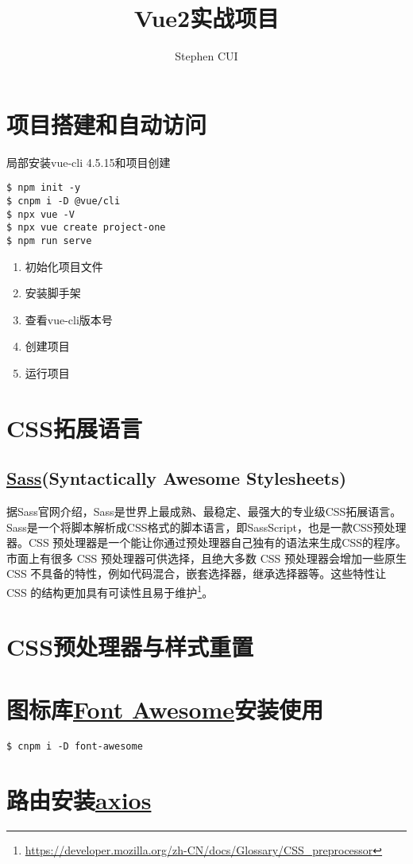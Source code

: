 \documentclass{article}
\title{Vue2实战项目}
\author{Stephen CUI}
\begin{document}
\maketitle
\section{项目搭建和自动访问}
局部安装vue-cli 4.5.15和项目创建
\begin{lstlisting}
$ npm init -y
$ cnpm i -D @vue/cli
$ npx vue -V
$ npx vue create project-one
$ npm run serve
\end{lstlisting}

\begin{enumerate}
\item 初始化项目文件
\item 安装脚手架
\item 查看vue-cli版本号
\item 创建项目
\item 运行项目
\end{enumerate}

\section{CSS拓展语言}
\subsection{\href{https://www.sass.hk/}{Sass}(Syntactically Awesome Stylesheets)}
据Sass官网介绍，Sass是世界上最成熟、最稳定、最强大的专业级CSS拓展语言。Sass是一个将脚本解析成CSS格式的脚本语言，即SassScript，也是一款CSS预处理器。CSS 预处理器是一个能让你通过预处理器自己独有的语法来生成CSS的程序。市面上有很多 CSS 预处理器可供选择，且绝大多数 CSS 预处理器会增加一些原生 CSS 不具备的特性，例如代码混合，嵌套选择器，继承选择器等。这些特性让 CSS 的结构更加具有可读性且易于维护\footnote{\url{https://developer.mozilla.org/zh-CN/docs/Glossary/CSS_preprocessor}}。
\section{CSS预处理器与样式重置}

\section{图标库\href{https://fontawesome.com.cn/}{Font Awesome}安装使用}
\begin{lstlisting}
$ cnpm i -D font-awesome
\end{lstlisting}
\section{路由安装\href{https://axios-http.com/zh/}{axios}}
\end{document}
